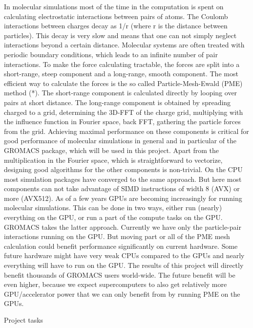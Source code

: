 \documentclass[12pt,a4paper,notitlepage]{report}
\begin{document}
\tableofcontents
\newpage


\iffalse
In molecular simulations most of the time in the computation is spent on calculating electrostatic interactions between pairs of atoms. The Coulomb interactions between charges decay as 1/r (where r is the distance between particles). This decay is very slow and means that one can not simply neglect interactions beyond a certain distance. Molecular systems are often treated with periodic boundary conditions, which leads to an infinite number of pair interactions. To make the force calculating tractable, the forces are split into a short-range, steep component and a long-range, smooth component. The most efficient way to calculate the forces is the so called Particle-Mesh-Ewald (PME) method (*). The short-range component is calculated directly by looping over pairs at short distance. The long-range component is obtained by spreading charged to a grid, determining the 3D-FFT of the charge grid, multiplying with the influence function in Fourier space, back FFT, gathering the particle forces from the grid. Achieving maximal performance on these components is critical for good performance of molecular simulations in general and in particular of the GROMACS package, which will be used in this project. Apart from the multiplication in the Fourier space, which is straightforward to vectorize, designing good algorithms for the other components is non-trivial. On the CPU most simulation packages have converged to the same approach. But here most components can not take advantage of SIMD instructions of width 8 (AVX) or more (AVX512). As of a few years GPUs are becoming increasingly for running molecular simulations. This can be done in two ways, either run (nearly) everything on the GPU, or run a part of the compute tasks on the GPU. GROMACS takes the latter approach. Currently we have only the particle-pair interactions running on the GPU. But moving part or all of the PME mesh calculation could benefit performance significantly on current hardware. Some future hardware might have very weak CPUs compared to the GPUs and nearly everything will have to run on the GPU. The results of this project will directly benefit thousands of GROMACS users world-wide. The future benefit will be even higher, because we expect supercomputers to also get relatively more GPU/accelerator power that we can only benefit from by running PME on the GPUs.

Project tasks
\end{document}

